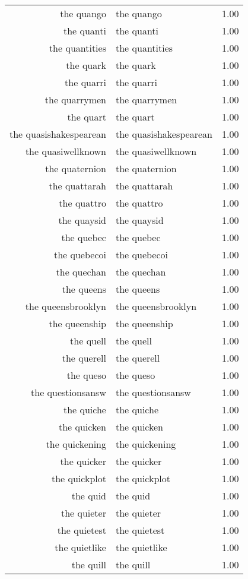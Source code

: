\begin{table}[ht]
\begin{tabular}{rlr}
  the quango & the quango & 1.00 \\ 
  the quanti & the quanti & 1.00 \\ 
  the quantities & the quantities & 1.00 \\ 
  the quark & the quark & 1.00 \\ 
  the quarri & the quarri & 1.00 \\ 
  the quarrymen & the quarrymen & 1.00 \\ 
  the quart & the quart & 1.00 \\ 
  the quasishakespearean & the quasishakespearean & 1.00 \\ 
  the quasiwellknown & the quasiwellknown & 1.00 \\ 
  the quaternion & the quaternion & 1.00 \\ 
  the quattarah & the quattarah & 1.00 \\ 
  the quattro & the quattro & 1.00 \\ 
  the quaysid & the quaysid & 1.00 \\ 
  the quebec & the quebec & 1.00 \\ 
  the quebecoi & the quebecoi & 1.00 \\ 
  the quechan & the quechan & 1.00 \\ 
  the queens & the queens & 1.00 \\ 
  the queensbrooklyn & the queensbrooklyn & 1.00 \\ 
  the queenship & the queenship & 1.00 \\ 
  the quell & the quell & 1.00 \\ 
  the querell & the querell & 1.00 \\ 
  the queso & the queso & 1.00 \\ 
  the questionsansw & the questionsansw & 1.00 \\ 
  the quiche & the quiche & 1.00 \\ 
  the quicken & the quicken & 1.00 \\ 
  the quickening & the quickening & 1.00 \\ 
  the quicker & the quicker & 1.00 \\ 
  the quickplot & the quickplot & 1.00 \\ 
  the quid & the quid & 1.00 \\ 
  the quieter & the quieter & 1.00 \\ 
  the quietest & the quietest & 1.00 \\ 
  the quietlike & the quietlike & 1.00 \\ 
  the quill & the quill & 1.00 \\ 

\end{tabular}
\end{table}
